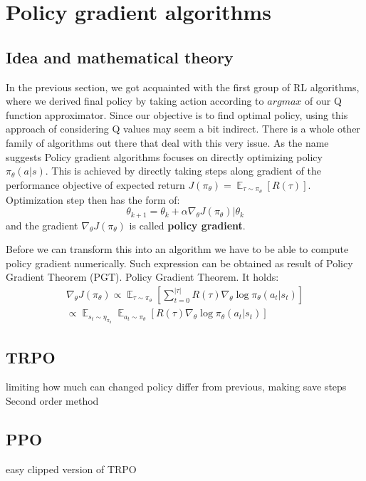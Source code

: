 \section{Policy gradient algorithms}
\subsection*{Idea and mathematical theory}
In the previous section, we got acquainted with the first group of RL algorithms, where we derived final policy by taking action according to $argmax$ of our Q function approximator.
Since our objective is to find optimal policy, using this approach of considering Q values may seem a bit indirect.
There is a whole other family of algorithms out there that deal with this very issue.
As the name suggests Policy gradient algorithms focuses on directly optimizing policy $\pi_\theta(a|s)$. 
This is achieved by directly taking steps along gradient of the performance objective of expected return $J(\pi_\theta) = \mathop{\mathbb{E}}_{\tau \sim \pi_\theta}[R(\tau)]$.
Optimization step then has the form of:
\[\theta_{k+1} = \theta_k+\alpha  \nabla_\theta J(\pi_\theta)|\theta_k\] and the gradient $\nabla_\theta J(\pi_\theta)$ is called \textbf{policy gradient}.

Before we can transform this into an algorithm we have to be able to compute policy gradient numerically.
Such expression can be obtained as result of Policy Gradient Theorem (PGT).
Policy Gradient Theorem. It holds: 
\begin{align*}
  \nabla_\theta J(\pi_\theta) \propto \mathop{\mathbb{E}}_{\tau \sim \pi_\theta}[\sum_{t=0}^{|\tau|}R(\tau) \nabla_\theta \log \pi_\theta(a_t|s_t)] \\
   \propto \mathop{\mathbb{E}}_{s_t \sim \eta_{\pi_\theta}}  \mathop{\mathbb{E}}_{a_t \sim \pi_\theta}  [R(\tau) \nabla_\theta \log \pi_\theta(a_t|s_t)]
\end{align*}




\subsection*{TRPO}
limiting how much can changed policy differ from previous, making save steps
Second order method

\subsection*{PPO}
easy clipped version of TRPO




